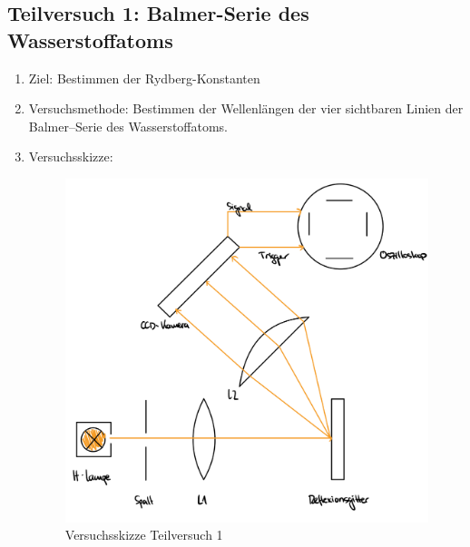 \documentclass{article}
\begin{document}
\newpage

\subsection{Teilversuch 1: Balmer-Serie des Wasserstoffatoms}
\begin{enumerate}[label = (\Roman*)]
    \item Ziel: Bestimmen der Rydberg-Konstanten
    
    \item Versuchsmethode: Bestimmen der Wellenlängen der vier sichtbaren Linien der Balmer–Serie des Wasserstoffatoms.
    
    \item Versuchsskizze:
    
        \begin{figure}[H]
        \centering
        \includegraphics[width=0.7\linewidth]{Abbildungen/TV1.jpeg}
        \caption{Versuchsskizze Teilversuch 1}
        \end{figure}


\end{enumerate}
\end{document}
